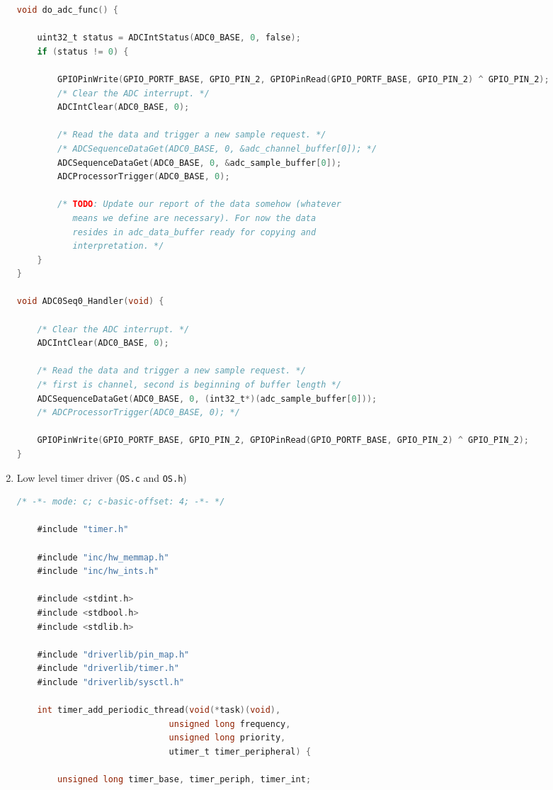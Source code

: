 \documentclass[12pt]{article}
\begin{document}
\begin{enumerate}[1)]
\begin{lstlisting}[language=C]
void do_adc_func() {

    uint32_t status = ADCIntStatus(ADC0_BASE, 0, false);
    if (status != 0) {

        GPIOPinWrite(GPIO_PORTF_BASE, GPIO_PIN_2, GPIOPinRead(GPIO_PORTF_BASE, GPIO_PIN_2) ^ GPIO_PIN_2);
        /* Clear the ADC interrupt. */
        ADCIntClear(ADC0_BASE, 0);

        /* Read the data and trigger a new sample request. */
        /* ADCSequenceDataGet(ADC0_BASE, 0, &adc_channel_buffer[0]); */
        ADCSequenceDataGet(ADC0_BASE, 0, &adc_sample_buffer[0]);
        ADCProcessorTrigger(ADC0_BASE, 0);

        /* TODO: Update our report of the data somehow (whatever
           means we define are necessary). For now the data
           resides in adc_data_buffer ready for copying and
           interpretation. */
    }
}

void ADC0Seq0_Handler(void) {

    /* Clear the ADC interrupt. */
    ADCIntClear(ADC0_BASE, 0);

    /* Read the data and trigger a new sample request. */
    /* first is channel, second is beginning of buffer length */
    ADCSequenceDataGet(ADC0_BASE, 0, (int32_t*)(adc_sample_buffer[0]));
    /* ADCProcessorTrigger(ADC0_BASE, 0); */

    GPIOPinWrite(GPIO_PORTF_BASE, GPIO_PIN_2, GPIOPinRead(GPIO_PORTF_BASE, GPIO_PIN_2) ^ GPIO_PIN_2);
}
  \end{lstlisting}
\item Low level timer driver (\verb|OS.c| and \verb|OS.h|) \\
  \begin{lstlisting}[language=C]
    /* -*- mode: c; c-basic-offset: 4; -*- */

    #include "timer.h"

    #include "inc/hw_memmap.h"
    #include "inc/hw_ints.h"

    #include <stdint.h>
    #include <stdbool.h>
    #include <stdlib.h>

    #include "driverlib/pin_map.h"
    #include "driverlib/timer.h"
    #include "driverlib/sysctl.h"

    int timer_add_periodic_thread(void(*task)(void),
                              unsigned long frequency,
                              unsigned long priority,
                              utimer_t timer_peripheral) {

        unsigned long timer_base, timer_periph, timer_int;


\end{lstlisting}
\end{enumerate}
\end{document}
